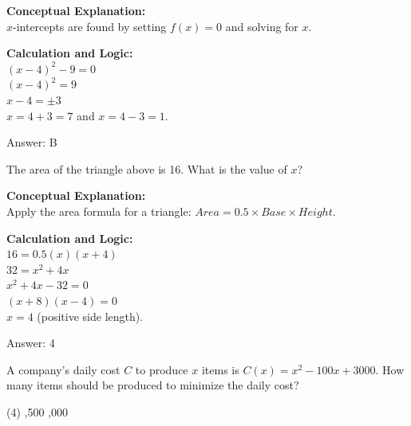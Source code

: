 \documentclass[11pt,paper=a4,answers]{exam}
\begin{document}
\begin{questions}
\begin{solution}
\textbf{Conceptual Explanation:} \\
$x$-intercepts are found by setting $f(x) = 0$ and solving for $x$.

\vspace{20pt}

\textbf{Calculation and Logic:} \\
$(x-4)^2 - 9 = 0$ \\
$(x-4)^2 = 9$ \\
$x - 4 = \pm 3$ \\
$x = 4+3=7$ and $x = 4-3=1$.

\vspace{25pt}

Answer: \colorbox{yellow!100}{B}
\end{solution}

\vspace{40pt}

\question
\begin{center}
\end{center}
The area of the triangle above is 16. What is the value of $x$?

\begin{solution}
\textbf{Conceptual Explanation:} \\
Apply the area formula for a triangle: $Area = 0.5 \times Base \times Height$.

\vspace{20pt}

\textbf{Calculation and Logic:} \\
$16 = 0.5(x)(x+4)$ \\
$32 = x^2 + 4x$ \\
$x^2 + 4x - 32 = 0$ \\
$(x+8)(x-4) = 0$ \\
$x = 4$ (positive side length).

\vspace{25pt}

Answer: \colorbox{yellow!100}{4}
\end{solution}

\vspace{40pt}

\question
A company's daily cost $C$ to produce $x$ items is $C(x) = x^2 - 100x + 3000$. How many items should be produced to minimize the daily cost?
\begin{tasks}(4)
    ,500
    ,000
\end{tasks}


\end{questions}
\end{document}
